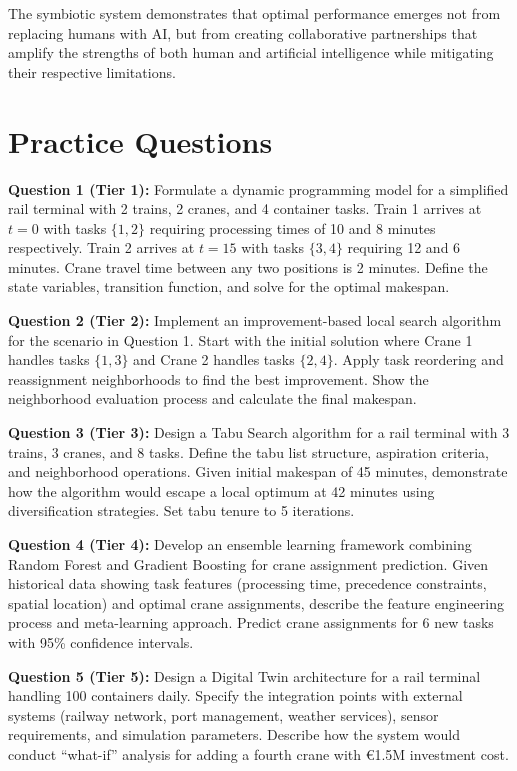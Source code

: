 \documentclass{article}
\begin{document}
The symbiotic system demonstrates that optimal performance emerges not from replacing humans with AI, but from creating collaborative partnerships that amplify the strengths of both human and artificial intelligence while mitigating their respective limitations.

\section{Practice Questions}

\textbf{Question 1 (Tier 1):} Formulate a dynamic programming model for a simplified rail terminal with 2 trains, 2 cranes, and 4 container tasks. Train 1 arrives at $t=0$ with tasks $\{1,2\}$ requiring processing times of 10 and 8 minutes respectively. Train 2 arrives at $t=15$ with tasks $\{3,4\}$ requiring 12 and 6 minutes. Crane travel time between any two positions is 2 minutes. Define the state variables, transition function, and solve for the optimal makespan.

\textbf{Question 2 (Tier 2):} Implement an improvement-based local search algorithm for the scenario in Question 1. Start with the initial solution where Crane 1 handles tasks $\{1,3\}$ and Crane 2 handles tasks $\{2,4\}$. Apply task reordering and reassignment neighborhoods to find the best improvement. Show the neighborhood evaluation process and calculate the final makespan.

\textbf{Question 3 (Tier 3):} Design a Tabu Search algorithm for a rail terminal with 3 trains, 3 cranes, and 8 tasks. Define the tabu list structure, aspiration criteria, and neighborhood operations. Given initial makespan of 45 minutes, demonstrate how the algorithm would escape a local optimum at 42 minutes using diversification strategies. Set tabu tenure to 5 iterations.

\textbf{Question 4 (Tier 4):} Develop an ensemble learning framework combining Random Forest and Gradient Boosting for crane assignment prediction. Given historical data showing task features (processing time, precedence constraints, spatial location) and optimal crane assignments, describe the feature engineering process and meta-learning approach. Predict crane assignments for 6 new tasks with 95\% confidence intervals.

\textbf{Question 5 (Tier 5):} Design a Digital Twin architecture for a rail terminal handling 100 containers daily. Specify the integration points with external systems (railway network, port management, weather services), sensor requirements, and simulation parameters. Describe how the system would conduct ``what-if'' analysis for adding a fourth crane with €1.5M investment cost.
\end{document}
